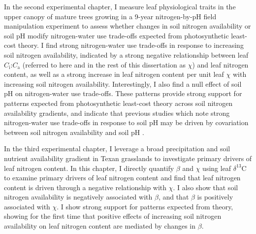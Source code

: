 In the second experimental chapter, I measure leaf physiological traits in the upper canopy of mature trees growing in a 9-year nitrogen-by-pH field manipulation experiment to assess whether changes in soil nitrogen availability or soil pH modify nitrogen-water use trade-offs expected from photosynthetic least-cost theory. I find strong nitrogen-water use trade-offs in response to increasing soil nitrogen availability, indicated by a strong negative relationship between leaf $C_\mathrm{i}$:$C_\mathrm{a}$ (referred to here and in the rest of this dissertation as $\chi$) and leaf nitrogen content, as well as a strong increase in leaf nitrogen content per unit leaf $\chi$ with increasing soil nitrogen availability. Interestingly, I also find a null effect of soil pH on nitrogen-water use trade-offs. These patterns provide strong support for patterns expected from photosynthetic least-cost theory across soil nitrogen availability gradients, and indicate that previous studies which note strong nitrogen-water use trade-offs in response to soil pH may be driven by covariation between soil nitrogen availability and soil pH .

In the third experimental chapter, I leverage a broad precipitation and soil nutrient availability gradient in Texan grasslands to investigate primary drivers of leaf nitrogen content. In this chapter, I directly quantify $\beta$ and $\chi$ using leaf $\delta^{13}$C to examine primary drivers of leaf nitrogen content and find that leaf nitrogen content is driven through a negative relationship with $\chi$. I also show that soil nitrogen availability is negatively associated with $\beta$, and that $\beta$ is positively associated with $\chi$. I show strong support for patterns expected from theory, showing for the first time that positive effects of increasing soil nitrogen availability on leaf nitrogen content are mediated by changes in $\beta$.

